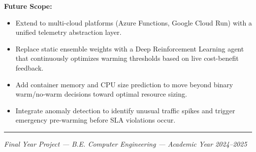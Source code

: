 \documentclass[10pt,a4paper]{article}
\begin{document}
\smallskip
\noindent\textbf{Future Scope:}
\begin{itemize}[leftmargin=1.4em, itemsep=1pt, topsep=1pt]
\item Extend to multi-cloud platforms (Azure Functions, Google Cloud Run) with a unified telemetry abstraction layer.
\item Replace static ensemble weights with a Deep Reinforcement Learning agent that continuously optimizes warming thresholds based on live cost-benefit feedback.
\item Add container memory and CPU size prediction to move beyond binary warm/no-warm decisions toward optimal resource sizing.
\item Integrate anomaly detection to identify unusual traffic spikes and trigger emergency pre-warming before SLA violations occur.
\end{itemize}

\noindent\rule{\linewidth}{0.8pt}
\begin{center}
\small\textit{Final Year Project --- B.E. Computer Engineering --- Academic Year 2024--2025}
\end{center}
\end{document}
